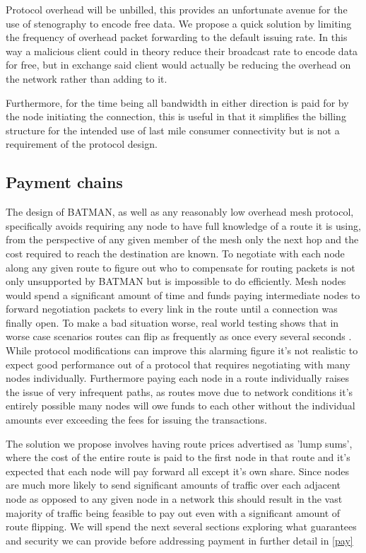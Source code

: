 \documentclass[11pt]{article}
\begin{document}
                Protocol overhead will be unbilled, this provides an unfortunate avenue for the use of stenography to encode free data. We propose a quick solution by limiting the frequency of overhead packet forwarding to the default issuing rate. In this way a malicious client could in theory reduce their broadcast rate to encode data for free, but in exchange said client would actually be reducing the overhead on the network rather than adding to it.

                Furthermore, for the time being all bandwidth in either direction is paid for by the node initiating the connection, this is useful in that it simplifies the billing structure for the intended use of last mile consumer connectivity but is not a requirement of the protocol design.

	\subsection{Payment chains} \label{paychains}

               The design of BATMAN, as well as any reasonably low overhead mesh protocol, specifically avoids requiring any node to have full knowledge of a route it is using, from the perspective of any given member of the mesh only the next hop and the cost required to reach the destination are known. To negotiate with each node along any given route to figure out who to compensate for routing packets is not only unsupported by BATMAN but is impossible to do efficiently. Mesh nodes would spend a significant amount of time and funds paying intermediate nodes to forward negotiation packets to every link in the route until a connection was finally open. To make a bad situation worse, real world testing shows that in worse case scenarios routes can flip as frequently as once every several seconds \cite{meshflip}. While protocol modifications can improve this alarming figure it's not realistic to expect good performance out of a protocol that requires negotiating with many nodes individually. Furthermore paying each node in a route individually raises the issue of very infrequent paths, as routes move due to network conditions it's entirely possible many nodes will owe funds to each other without the individual amounts ever exceeding the fees for issuing the transactions.

               The solution we propose involves having route prices advertised as 'lump sums', where the cost of the entire route is paid to the first node in that route and it's expected that each node will pay forward all except it's own share. Since nodes are much more likely to send significant amounts of traffic over each adjacent node as opposed to any given node in a network this should result in the vast majority of traffic being feasible to pay out even with a significant amount of route flipping. We will spend the next several sections exploring what guarantees and security we can provide before addressing payment in further detail in \ref{pay}
\end{document}
